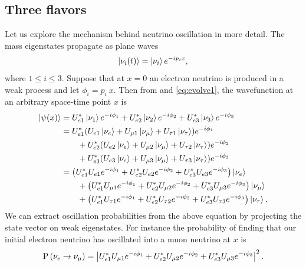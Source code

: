 \subsection{Three flavors}
Let us explore the mechanism behind neutrino oscillation in more detail.
The mass eigenstates propagate as plane waves
\begin{equation}
  \label{eq:evolve1}
  \ket{\nu_i(t)}=\ket{\nu_i}e^{-ip_ix},
\end{equation}
where $1\leq i\leq3$. Suppose that at $x=0$ an electron neutrino
is produced in a weak process and let $\phi_i=p_i~x$. Then from  
and \eqref{eq:evolve1}, the wavefunction at an arbitrary
space-time point $x$ is
\begin{equation}
  \begin{aligned}
    \ket{\psi(x)}&=U_{e1}^*\ket{\nu_1}e^{-i\phi_1}
                  +U_{e2}^*\ket{\nu_2}e^{-i\phi_2}
                  +U_{e3}^*\ket{\nu_3}e^{-i\phi_3} \\
                 &=U_{e1}^*(U_{e1}\ket{\nu_e}+U_{\mu 1}\ket{\nu_\mu}
                   +U_{\tau 1}\ket{\nu_\tau})e^{-i\phi_1} \\
                 &~~~~~~
                  +U_{e2}^*(U_{e2}\ket{\nu_e}+U_{\mu 2}\ket{\nu_\mu}
                   +U_{\tau 2}\ket{\nu_\tau})e^{-i\phi_2} \\
                 &~~~~~~
                  +U_{e3}^*(U_{e3}\ket{\nu_e}+U_{\mu 3}\ket{\nu_\mu}
                   +U_{\tau 3}\ket{\nu_\tau})e^{-i\phi_3} \\
                 &=\left(U_{e1}^*U_{e1}e^{-i\phi_1}
                    +U_{e2}^*U_{e2}e^{-i\phi_2}
                    +U_{e3}^*U_{e3}e^{-i\phi_3}\right)\ket{\nu_e} \\
                 &~~~~~~
                   +\left(U_{e1}^*U_{\mu 1}e^{-i\phi_1}
                    +U_{e2}^*U_{\mu 2}e^{-i\phi_2}
                    +U_{e3}^*U_{\mu 3}e^{-i\phi_3}\right)\ket{\nu_\mu} \\
                 &~~~~~~
                   +\left(U_{e1}^*U_{\tau 1}e^{-i\phi_1}
                    +U_{e2}^*U_{\tau 2}e^{-i\phi_2}
                    +U_{e3}^*U_{\tau 3}e^{-i\phi_3}\right)\ket{\nu_\tau}.
  \end{aligned}
\end{equation}
We can extract oscillation probabilities from the above equation by projecting
the state vector on weak eigenstates. For instance the probability of finding
that our initial electron neutrino has oscillated into a muon neutrino at $x$ is
\begin{equation}
  \operatorname{P}\left(\nu_e\to\nu_\mu\right)=\left|U_{e1}^*U_{\mu 1}e^{-i\phi_1}
                    +U_{e2}^*U_{\mu 2}e^{-i\phi_2}
                    +U_{e3}^*U_{\mu 3}e^{-i\phi_3}\right|^2.
\end{equation}
